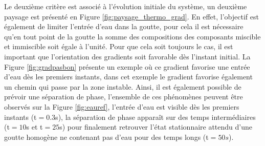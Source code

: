 Le deuxième critère est associé à l'évolution initiale du système, un deuxième paysage est présenté en Figure \ref{fig:paysage_thermo_grad}. En effet, l'objectif est également de limiter l'entrée d'eau dans la goutte, pour cela il est nécessaire qu'en tout point de la goutte la somme des compositions des composants miscible et immiscible soit égale à l'unité. Pour que cela soit toujours le cas, il est important que l'orientation des gradients soit favorable dès l'instant initial. La Figure \ref{fig:gradpasbon} présente un exemple où ce gradient favorise une entrée d'eau dès les premiers instants, dans cet exemple le gradient favorise également un chemin qui passe par la zone instable. Ainsi, il est également possible de prévoir une séparation de phase, l'ensemble de ces phénomènes peuvent être observés sur la Figure \ref{fig:eauref}, l'entrée d'eau est visible dès les premiers instants (t$=0.3$s), la séparation de phase apparaît sur des temps intermédiaires (t$=10$s et t$=25$s) pour finalement retrouver l'état stationnaire attendu d'une goutte homogène ne contenant pas d'eau pour des temps longs (t$=50s$).

